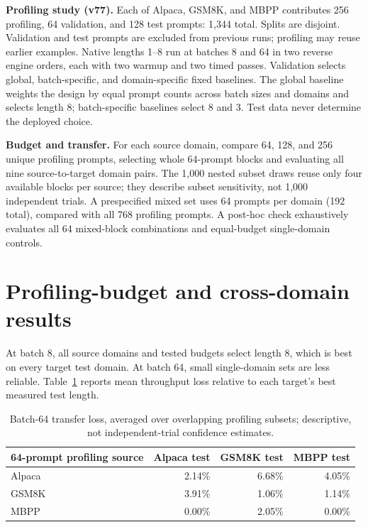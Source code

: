 \documentclass[10pt]{article}
\begin{document}
\textbf{Profiling study (v77).} Each of Alpaca, GSM8K, and MBPP contributes 256 profiling, 64 validation, and 128 test prompts: 1,344 total. Splits are disjoint. Validation and test prompts are excluded from previous runs; profiling may reuse earlier examples. Native lengths 1--8 run at batches 8 and 64 in two reverse engine orders, each with two warmup and two timed passes. Validation selects global, batch-specific, and domain-specific fixed baselines. The global baseline weights the design by equal prompt counts across batch sizes and domains and selects length 8; batch-specific baselines select 8 and 3. Test data never determine the deployed choice.

\textbf{Budget and transfer.} For each source domain, compare 64, 128, and 256 unique profiling prompts, selecting whole 64-prompt blocks and evaluating all nine source-to-target domain pairs. The 1,000 nested subset draws reuse only four available blocks per source; they describe subset sensitivity, not 1,000 independent trials. A prespecified mixed set uses 64 prompts per domain (192 total), compared with all 768 profiling prompts. A post-hoc check exhaustively evaluates all 64 mixed-block combinations and equal-budget single-domain controls.

\section{Profiling-budget and cross-domain results}
At batch 8, all source domains and tested budgets select length 8, which is best on every target test domain. At batch 64, small single-domain sets are less reliable. Table~\ref{transfer} reports mean throughput loss relative to each target's best measured test length.

\begin{table}[h]\centering\small
\begin{tabular}{@{}lrrr@{}}\toprule
64-prompt profiling source & Alpaca test & GSM8K test & MBPP test \\\midrule
Alpaca & 2.14\% & 6.68\% & 4.05\% \\
GSM8K & 3.91\% & 1.06\% & 1.14\% \\
MBPP & 0.00\% & 2.05\% & 0.00\% \\\bottomrule
\end{tabular}
\caption{Batch-64 transfer loss, averaged over overlapping profiling subsets; descriptive, not independent-trial confidence estimates.}\label{transfer}
\end{table}
\end{document}
